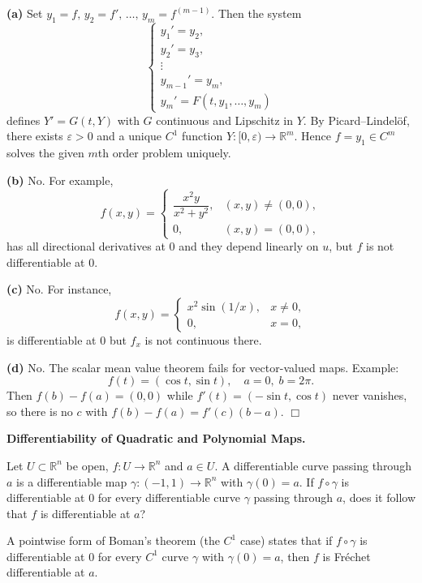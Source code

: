 \begin{solution}
\par\medskip\noindent\textbf{(a)}\quad
Set $y_1=f,\,y_2=f',\,\dots,\,y_m=f^{(m-1)}$.
Then the system
\[
\begin{cases}
	y_1'=y_2,\\
	y_2'=y_3,\\
	\vdots\\
	y_{m-1}'=y_m,\\
	y_m'=F(t,y_1,\dots,y_m)
\end{cases}
\]
defines $Y' = G(t,Y)$ with $G$ continuous and Lipschitz in $Y$.
By Picard--Lindel\"of, there exists $\varepsilon>0$ and a unique $C^1$ function
$Y:[0,\varepsilon)\to\mathbb{R}^m$.
Hence $f=y_1\in C^m$ solves the given $m$th order problem uniquely.

\par\medskip\noindent\textbf{(b)}\quad
No. For example,
\[
f(x,y)=
\begin{cases}
	\dfrac{x^2y}{x^2+y^2}, & (x,y)\ne(0,0),\\[4pt]
	0,&(x,y)=(0,0),
\end{cases}
\]
has all directional derivatives at $0$ and they depend linearly on $u$,
but $f$ is not differentiable at $0$.

\par\medskip\noindent\textbf{(c)}\quad
No. For instance,
\[
f(x,y)=
\begin{cases}
	x^2\sin(1/x), & x\ne0,\\[4pt]
	0,&x=0,
\end{cases}
\]
is differentiable at $0$ but $f_x$ is not continuous there.

\par\medskip\noindent\textbf{(d)}\quad
No. The scalar mean value theorem fails for vector-valued maps. Example:
\[
f(t)=(\cos t,\sin t),\quad a=0,\;b=2\pi.
\]
Then $f(b)-f(a)=(0,0)$ while $f'(t)=(-\sin t,\cos t)$ never vanishes,
so there is no $c$ with $f(b)-f(a)=f'(c)(b-a)$.
\hfill$\Box$
\end{solution}

\begin{problem}[CP-II-0279]
\label{prob:cp-ii-0279}
\textbf{Differentiability of Quadratic and Polynomial Maps.}

\hspace*{1.5em}Let $U\subset\mathbb{R}^n$ be open, $f:U\to\mathbb{R}^n$ and $a\in U$.
A differentiable curve passing through $a$ is a differentiable map
$\gamma:(-1,1)\to\mathbb{R}^n$ with $\gamma(0)=a$.
If $f\circ\gamma$ is differentiable at $0$ for every differentiable curve $\gamma$ passing through $a$,
does it follow that $f$ is differentiable at $a$?

A pointwise form of Boman's theorem (the $C^1$ case) states that if $f\circ\gamma$ is differentiable
at $0$ for every $C^1$ curve $\gamma$ with $\gamma(0)=a$, then $f$ is Fr\'echet differentiable at $a$.
\end{problem}

